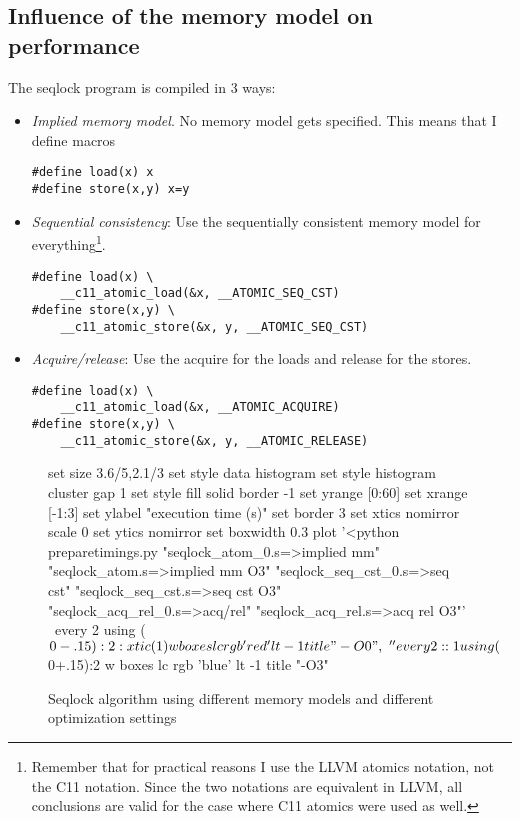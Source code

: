 \documentclass[journal]{IEEEtran}
\begin{document}
\begin{figure}[h]
    
\end{figure}

\subsection{Influence of the memory model on performance}
The seqlock program is compiled in 3 ways: 
\begin{itemize}
    \item \emph{Implied memory model}. No memory model gets specified.
        This means that I define macros 
        \begin{lstlisting}
#define load(x) x
#define store(x,y) x=y
        \end{lstlisting}
    \item \emph{Sequential consistency}: Use the sequentially consistent memory model for everything\footnote{Remember that for practical reasons I use the LLVM atomics notation, not the C11 notation. Since the two notations are equivalent in LLVM, all conclusions are valid for the case where C11 atomics were used as well.}.
        \begin{lstlisting}
#define load(x) \
    __c11_atomic_load(&x, __ATOMIC_SEQ_CST)
#define store(x,y) \
    __c11_atomic_store(&x, y, __ATOMIC_SEQ_CST)
        \end{lstlisting}
\item \emph{Acquire/release}: Use the acquire for the loads and release for the stores.
        \begin{lstlisting}
#define load(x) \
    __c11_atomic_load(&x, __ATOMIC_ACQUIRE)
#define store(x,y) \
    __c11_atomic_store(&x, y, __ATOMIC_RELEASE)
        \end{lstlisting}
\end{itemize}

\begin{figure}[h]
    \begin{gnuplot}[terminal=epslatex,terminaloptions=color]
        set size 3.6/5,2.1/3
        set style data histogram
        set style histogram cluster gap 1
        set style fill solid border -1
        set yrange [0:60]
        set xrange [-1:3]
        set ylabel "execution time (s)"
        set border 3
        set xtics nomirror scale 0
        set ytics nomirror
        set boxwidth 0.3
        plot '<python preparetimings.py "seqlock_atom_0.s=>implied mm" "seqlock_atom.s=>implied mm O3" "seqlock_seq_cst_0.s=>seq cst" "seqlock_seq_cst.s=>seq cst O3" "seqlock_acq_rel_0.s=>acq/rel" "seqlock_acq_rel.s=>acq rel O3"' \
               every 2    using ($0-.15):2:xtic(1) w boxes lc rgb 'red' lt -1 title "-O0", \
            '' every 2::1 using ($0+.15):2 w boxes lc rgb 'blue' lt -1 title "-O3"
    \end{gnuplot}
    \caption{Seqlock algorithm using different memory models and different optimization settings}
    \label{fig:seqlock-mm}
\end{figure}
\end{document}
